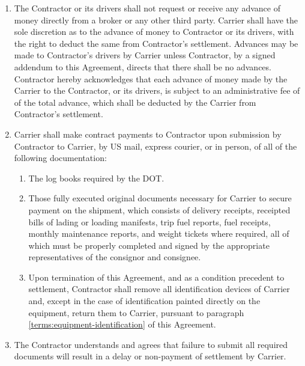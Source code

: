 \begin{enumerate}[ 
    ref = \SecondLevelEnumerator
]
    \item The Contractor or its drivers shall not request or receive any
    advance of money directly from a broker or any other third party.
    Carrier shall have the sole discretion as to the advance of money to
    Contractor or its drivers, with the right to deduct the same from
    Contractor's settlement. Advances may be made to Contractor's drivers
    by Carrier unless Contractor, by a signed addendum to this Agreement,
    directs that there shall be no advances. Contractor hereby acknowledges
    that each advance of money made by the Carrier to the Contractor, or
    its drivers, is subject to an administrative fee of
    {\bfseries \CashAdvanceServiceFee} of the total advance, which shall be
    deducted by the Carrier from Contractor's settlement.

    \item Carrier shall make contract payments to Contractor upon
    submission by Contractor to Carrier, by US mail, express courier, or in
    person, of all of the following documentation:
    \begin{enumerate}[
        ref = \ThirdLevelEnumerator
    ]
        \item The log books required by the DOT.
        
        \item Those fully executed original documents necessary for Carrier
        to secure payment on the shipment, which consists of delivery
        receipts, receipted bills of lading or loading manifests, trip fuel
        reports, fuel receipts, monthly maintenance reports, and weight
        tickets where required, all of which must be properly completed and
        signed by the appropriate representatives of the consignor and
        consignee.
        
        \item Upon termination of this Agreement, and as a condition
        precedent to settlement, Contractor shall remove all identification
        devices of Carrier and, except in the case of identification
        painted directly on the equipment, return them to Carrier, pursuant
        to paragraph \ref{terms:equipment-identification} of this
        Agreement.
    \end{enumerate}

    \item The Contractor understands and agrees that failure to submit all
    required documents will result in a delay or non-payment of settlement
    by Carrier.


\end{enumerate}
